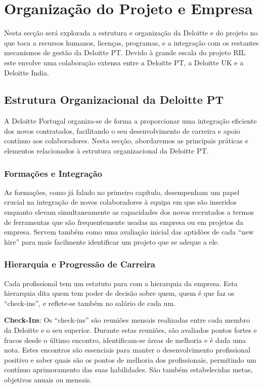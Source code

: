 \section{Organização do Projeto e Empresa}\label{sec:org-projeto-empresa}

    Nesta secção será explorada a estrutura e organização da Deloitte e do projeto no que toca a recursos humanos, licenças, programas, e a integração com os restantes mecanismos de gestão da Deloitte PT. Devido à grande escala do projeto RIL este envolve uma colaboração extensa entre a Deloitte PT, a Deloitte UK e a Deloitte India. 

    \subsection{Estrutura Organizacional da Deloitte PT}
        
        A Deloitte Portugal organiza-se de forma a proporcionar uma integração eficiente dos novos contratados, facilitando o seu desenvolvimento de carreira e apoio contínuo aos colaboradores. Nesta secção, abordaremos as principais práticas e elementos relacionados à estrutura organizacional da Deloitte PT.
        
        \subsubsection{Formações e Integração}\label{formacoes_e_integracao}
        
            As formações, como já falado no primeiro capítulo, desempenham um papel crucial na integração de novos colaboradores à equipa em que são inseridos enquanto elevam simultaneamente  as capacidades dos novos recrutados a termos de ferramentas que são frequentemente usadas na empresa ou em projetos da empresa. Servem também como uma avaliação inicial das aptidões de cada ``new hire'' para mais facilmente identificar um projeto que se adeque a ele.
        
        \subsubsection{Hierarquia e Progressão de Carreira}

            Cada profissional tem um estatuto para com a hierarquia da empresa. Esta hierarquia dita quem tem poder de decisão sobre quem, quem é que faz os ``check-ins'', e reflete-se também no salário de cada um.

            \textbf{Check-Ins}: Os ``check-ins'' são reuniões mensais realizadas entre cada membro da Deloitte e o seu superior. Durante estas reuniões, são avaliados pontos fortes e fracos desde o último encontro, identificam-se áreas de melhoria e é dada uma nota. Estes encontros são essenciais para manter o desenvolvimento profissional positivo e saber quais são os pontos de melhoria dos profissionais, permitindo um contínuo aprimoramento das suas habilidades. São também estabelecidas metas, objetivos anuais ou mensais.
                        
